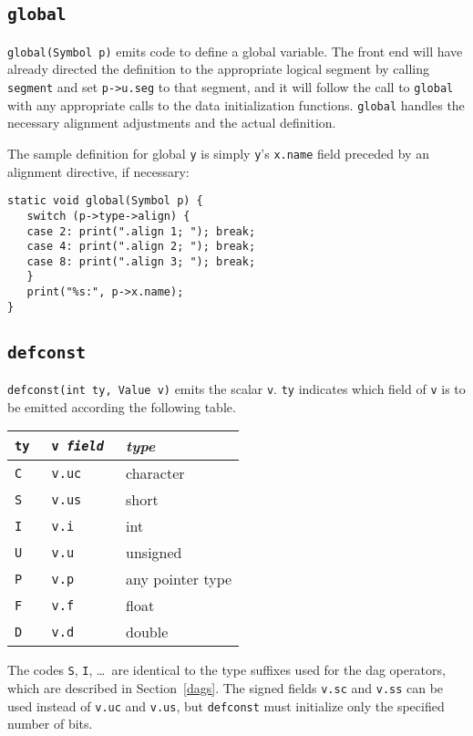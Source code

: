 \subsection{\tt global}

\label{global}
\verb|global(Symbol p)| emits code to define a global variable.
The front end will have already directed the definition
to the appropriate logical segment by calling \verb|segment| and
set \verb|p->u.seg| to that segment,
and it will follow the call to \verb|global|
with any appropriate calls to the data initialization functions.
\verb|global| handles the necessary alignment adjustments and
the actual definition.

The sample definition for global \verb|y| is simply
\verb|y|'s \verb|x.name| field preceded by an alignment directive, if necessary:
\begin{verbatim}
static void global(Symbol p) {
   switch (p->type->align) {
   case 2: print(".align 1; "); break;
   case 4: print(".align 2; "); break;
   case 8: print(".align 3; "); break;
   }
   print("%s:", p->x.name);
}
\end{verbatim}

\subsection{\tt defconst}

\label{defconst}

\verb|defconst(int ty, Value v)| emits the scalar \verb|v|.
\verb|ty| indicates which field of
\verb|v| is to be emitted according the following table.

\begin{center}
\begin{tabular}{lll}
\tt ty	& \tt v \it field	& \it type \\ \hline
\tt C	& \tt v.uc		& character \\
\tt S	& \tt v.us		& short \\
\tt I	& \tt v.i		& int \\
\tt U	& \tt v.u		& unsigned \\
\tt P	& \tt v.p		& any pointer type \\
\tt F	& \tt v.f		& float \\
\tt D	& \tt v.d		& double \\
\end{tabular}
\end{center}
The codes \verb|S|, \verb|I|, \ldots\ are identical to the type suffixes
used for the dag operators, which are described in Section~\ref{dags}.
The signed fields \verb|v.sc| and \verb|v.ss| can be used instead
of \verb|v.uc| and \verb|v.us|, but \verb|defconst|
must initialize only the specified number of bits.

